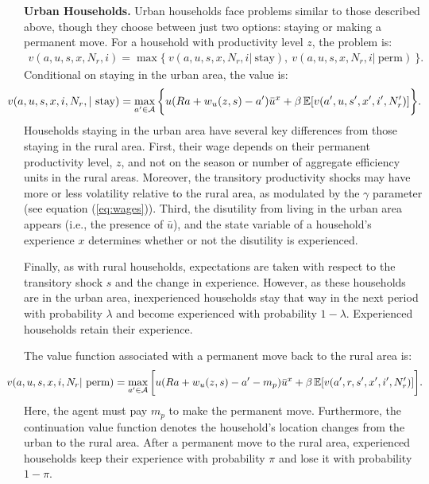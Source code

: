 \documentclass[pdftex,11pt]{article}
\begin{document}
\textbf{Urban Households.} Urban households face problems similar to those described above, though they choose between just two options: staying or making a permanent move. For a household with productivity level $z$, the problem is:
\begin{align}
v(a, u, s, x, N_r, i) = \max \bigg\{ \ v(a, u, s, x, N_r, i| \ \mbox{stay}), \  v(a, u, s, x, N_r,  i| \ \mbox{perm}) \ \bigg \}.
\label{eq:bellman_urban}
\end{align}
Conditional on staying in the urban area, the value is:
\begin{align}
\hspace{-0.60cm}v(a, u, s, x, i, N_r, | \ \mbox{stay}) =  \max_{a'\in \mathcal{A}}\bigg\{ u(Ra + w_{u}(z,s) - a' )\bar u^{x} + \beta \, \mathbb{E} [v(a',u,s',x',i',N_r')] \bigg\}.
\label{eq:bellman_urban_stay}
\end{align}
Households staying in the urban area have several key differences from those staying in the rural area. First, their wage depends on their permanent productivity level, $z$, and not on the season or number of aggregate efficiency units in the rural areas. Moreover, the transitory productivity shocks may have more or less volatility relative to the rural area, as modulated by the $\gamma$ parameter (see equation (\ref{eq:wages})). Third, the disutility from living in the urban area appears (i.e., the presence of $\bar u$), and the state variable of a household's experience $x$ determines whether or not the disutility is experienced.

Finally, as with rural households, expectations are taken with respect to the transitory shock $s$ and the change in experience. However, as these households are in the urban area, inexperienced households stay that way in the next period with probability $\lambda$ and become experienced with probability $1-\lambda$. Experienced households retain their experience.

The value function associated with a permanent move back to the rural area is:
\begin{align}
\hspace{-0.60cm} v(a, u, s, x, i, N_r | \ \mbox{perm}) = \max_{a'\in \mathcal{A}} \bigg[ u(Ra + w_{u}(z,s) - a' - m_{p} )\bar u^{x} + \beta \, \mathbb{E} [v(a',r, s', x', i',N_r')] \bigg].
\label{eq:bellman_urban_perm_move}
\end{align}
Here, the agent must pay $m_p$ to make the permanent move. Furthermore, the continuation value function denotes the household's location changes from the urban to the rural area. After a permanent move to the rural area, experienced households keep their experience with probability $\pi$ and lose it with probability $1-\pi$. 
\end{document}
